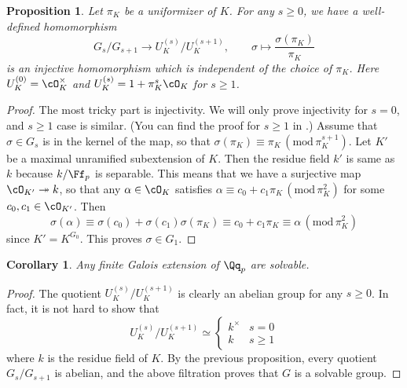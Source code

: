 \documentclass{article}
\newcommand{\Mod}[1]{\,(\mathrm{mod}\,#1)}
\newtheorem{corollary}{Corollary}
\newtheorem{proposition}{Proposition}
\begin{document}
\begin{proposition}
Let $\pi_K$ be a uniformizer of $K$. For any $s\geq 0$, we have a well-defined homomorphism 
$$
G_{s}/G_{s+1} \to U_{K}^{(s)}/U_{K}^{(s+1)}, \qquad \sigma \mapsto \frac{\sigma (\pi_{K})}{\pi_{K}}
$$
is an injective homomorphism which is independent of the choice of $\pi_{K}$. 
Here $U_{K}^{(0)} = \cO_{K}^{\times}$ and $U_{K}^{(s)} = 1+\pi_{K}^{s}\cO_{K}$ for $s\geq 1$. 
\end{proposition}
\begin{proof}
The most tricky part is injectivity. We will only prove injectivity for $s = 0$, and $s\geq 1$ case is similar. (You can find the proof for $s\geq 1$ in \cite{co2}.) 
Assume that $\sigma \in G_{s}$ is in the kernel of the map, so that $\sigma(\pi_{K}) \equiv \pi_{K} \Mod{\pi_{K}^{s+1}}$.  
Let $K'$ be a maximal unramified subextension of $K$. 
Then the residue field $k'$ is same as $k$ because $k/\Ff_{p}$ is separable. This means that we have a surjective map $\cO_{K'} \twoheadrightarrow k$, so that any $\alpha \in \cO_{K}$ satisfies $\alpha \equiv c_{0} + c_{1} \pi_{K}\Mod{\pi_{K}^{2}}$ for some $c_{0}, c_{1} \in \cO_{K'}$. Then
$$
\sigma(\alpha) \equiv \sigma(c_{0}) + \sigma(c_{1}) \sigma(\pi_{K}) \equiv c_{0} + c_{1} \pi_{K} \equiv \alpha\Mod{\pi_{K}^{2}}
$$
since $K' = K^{G_{0}}$. This proves $\sigma \in G_{1}$. 
\end{proof}
\begin{corollary}
Any finite Galois extension of $\Qq_p$ are solvable. 
\end{corollary}
\begin{proof}
The quotient $U_{K}^{(s)} /U_{K}^{(s+1)}$ is clearly an abelian group for any $s\geq 0$. In fact, it is not hard to show that 
$$
U_{K}^{(s)}/U_{K}^{(s+1)} \simeq \begin{cases} k^{\times} & s = 0 \\ k & s\geq 1\end{cases}
$$
where $k$ is the residue field of $K$. 
By the previous proposition, every quotient $G_{s}/G_{s+1}$ is abelian, and the above filtration proves that $G$ is a solvable group. 
\end{proof}
\end{document}
